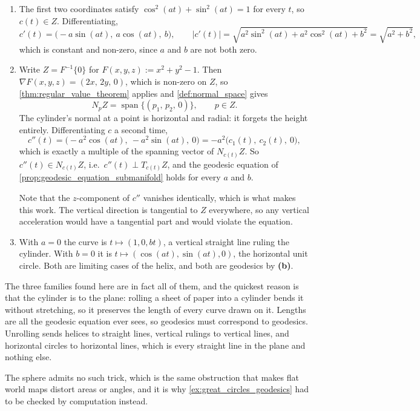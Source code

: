\begin{exercisesolution}
\label{sol:ai_cylinder_geodesics}
\begin{enumerate}[label=\textbf{(\alph*)}]
  \item The first two coordinates satisfy $\cos^2(at)+\sin^2(at) = 1$ for every $t$, so
    $c(t) \in Z$. Differentiating,
    \[c'(t) = \big(-a\sin(at),\ a\cos(at),\ b\big), \qquad
      \lvert c'(t)\rvert = \sqrt{a^2\sin^2(at)+a^2\cos^2(at)+b^2} = \sqrt{a^2+b^2},\]
    which is constant and non-zero, since $a$ and $b$ are not both zero.
  \item Write $Z = F^{-1}\{0\}$ for $F(x,y,z) := x^2+y^2-1$. Then
    $\nabla F(x,y,z) = (2x,\,2y,\,0)$, which is non-zero on $Z$, so
    \cref{thm:regular_value_theorem} applies and \cref{def:normal_space} gives
    \[N_pZ = \operatorname{span}\{(p_1,\,p_2,\,0)\}, \qquad p \in Z.\]
    The cylinder's normal at a point is horizontal and radial: it forgets the height entirely.
    Differentiating $c$ a second time,
    \[c''(t) = \big(-a^2\cos(at),\ -a^2\sin(at),\ 0\big)
             = -a^2\big(c_1(t),\ c_2(t),\ 0\big),\]
    which is exactly a multiple of the spanning vector of $N_{c(t)}Z$. So
    $c''(t) \in N_{c(t)}Z$, i.e.\ $c''(t) \perp T_{c(t)}Z$, and the geodesic equation of
    \cref{prop:geodesic_equation_submanifold} holds for every $a$ and $b$.

    Note that the $z$-component of $c''$ vanishes identically, which is what makes this work.
    The vertical direction is tangential to $Z$ everywhere, so any vertical acceleration would
    have a tangential part and would violate the equation.
  \item With $a = 0$ the curve is $t \mapsto (1,0,bt)$, a vertical straight line ruling the
    cylinder. With $b = 0$ it is $t \mapsto (\cos(at),\sin(at),0)$, the horizontal unit circle.
    Both are limiting cases of the helix, and both are geodesics by \textbf{(b)}.
\end{enumerate}

\begin{remark}
The three families found here are in fact all of them, and the quickest reason is that the
cylinder is  to the plane: rolling a sheet of paper into a cylinder
bends it without stretching, so it preserves the length of every curve drawn on it. Lengths are
all the geodesic equation ever sees, so geodesics must correspond to geodesics. Unrolling sends
helices to straight lines, vertical rulings to vertical lines, and horizontal circles to
horizontal lines, which is every straight line in the plane and nothing else.

The sphere admits no such trick, which is the same obstruction that makes flat world maps
distort areas or angles, and it is why \cref{ex:great_circles_geodesics} had to be checked by
computation instead.
\end{remark}
\end{exercisesolution}

